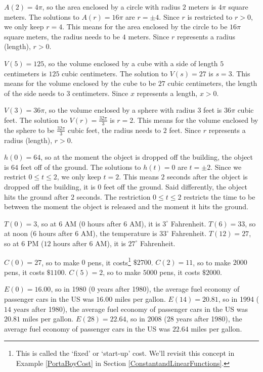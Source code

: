 \begin{tasks}[resume]
\task  $A(2) = 4\pi$, so the area enclosed by a circle with radius $2$ meters is $4\pi$ square meters.  The solutions to $A(r) = 16\pi$ are $r = \pm 4$.  Since $r$ is restricted to $r > 0$, we only keep $r = 4$.  This means for the area enclosed by the circle to be $16\pi$ square meters, the radius needs to be $4$ meters.  Since $r$ represents a radius (length), $r > 0$.

\task  $V(5) = 125$, so the volume enclosed by a cube with a side of length $5$ centimeters is $125$ cubic centimeters.  The solution to $V(s) = 27$ is $s = 3$.  This means for the volume enclosed by the cube to be $27$ cubic centimeters, the length of the side needs to $3$ centimeters.  Since $x$ represents a length, $x > 0$.

\task  $V(3) = 36\pi$, so the volume enclosed by a sphere with radius $3$ feet is $36\pi$ cubic feet.  The solution to $V(r) = \frac{32\pi}{3}$ is $r = 2$.  This means for the volume enclosed by the sphere to be $\frac{32\pi}{3}$ cubic feet, the radius needs to $2$ feet.  Since $r$ represents a radius (length), $r > 0$.


\task $h(0) = 64$, so at the moment the object is dropped off the building, the object is $64$ feet off of the ground.  The solutions to $h(t) = 0$ are $t = \pm 2$.  Since we restrict $0 \leq t \leq 2$, we only keep $t = 2$.  This means $2$ seconds after the object is dropped off the building, it is $0$ feet off the ground.  Said differently, the object hits the ground after $2$ seconds.  The restriction  $0 \leq t \leq 2$ restricts the time to be between the moment the object is released and the moment it hits the ground.


\task  $T(0) = 3$, so at 6 AM ($0$ hours after 6 AM), it is $3^{\circ}$ Fahrenheit.  $T(6) = 33$, so at noon ($6$ hours after 6 AM), the temperature is $33^{\circ}$ Fahrenheit.  $T(12) = 27$, so at 6 PM ($12$ hours after 6 AM), it is $27^{\circ}$ Fahrenheit.


\task $C(0) = 27$, so to make $0$ pens, it costs\footnote{This is called the `fixed' or `start-up' cost.  We'll revisit this concept in Example \ref{PortaBoyCost} in Section \ref{ConstantandLinearFunctions}.} $\$ 2700$.  $C(2) = 11$, so to make $2000$ pens, it costs $\$1100$.  $C(5) = 2$, so to make $5000$ pens, it costs $\$2000$.

\task $E(0) = 16.00$, so in 1980 ($0$ years after 1980), the average fuel economy of passenger cars in the US was $16.00$ miles per gallon.  $E(14) = 20.81$, so in 1994 ($14$ years after 1980), the average fuel economy of passenger cars in the US was $20.81$ miles per gallon.  $E(28) = 22.64$, so in 2008 ($28$ years after 1980), the average fuel economy of passenger cars in the US was $22.64$ miles per gallon.  



\end{tasks}
